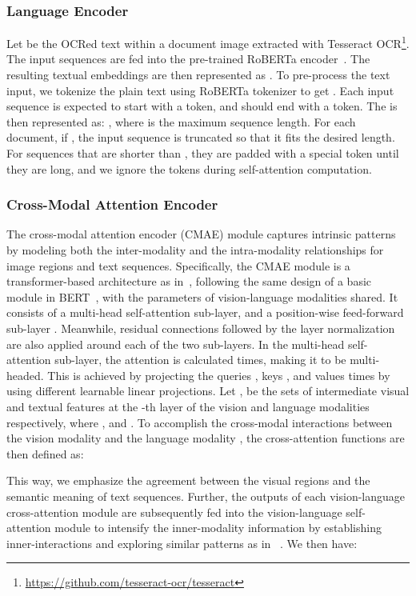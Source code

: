 \documentclass[preprint,review,12pt]{elsarticle}
\begin{document}
\subsubsection{Language Encoder}
Let  be the OCRed text within a document image extracted with Tesseract OCR\footnote{\url{https://github.com/tesseract-ocr/tesseract}}. The input sequences are fed into the pre-trained RoBERTa  encoder~\cite{liu2019roberta}. The resulting textual embeddings are then represented as . To pre-process the text input, we tokenize the plain text  using RoBERTa tokenizer to get . Each input sequence is expected to start with a  token, and should end with a  token. The  is then represented as: , where  is the maximum sequence length. For each document, if , the input sequence is truncated so that it fits the desired length. For sequences that are shorter than , they are padded with a special  token until they are  long, and we ignore the  tokens during self-attention computation.

\subsubsection{Cross-Modal Attention Encoder}
The cross-modal attention encoder (CMAE) module captures intrinsic patterns by modeling both the inter-modality and the intra-modality relationships for image regions and text sequences. Specifically, the CMAE module is a transformer-based architecture as in~\cite{vaswani2017attention}, following the same design of a basic module in BERT~\cite{devlin2018bert}, with the parameters of vision-language modalities shared. It consists of a multi-head self-attention sub-layer, and a position-wise feed-forward sub-layer . Meanwhile, residual connections followed by the layer normalization  are also applied around each of the two sub-layers. In the multi-head self-attention sub-layer, the attention is calculated  times, making it to be multi-headed. This is achieved by projecting the queries , keys , and values   times by using different learnable linear projections. Let ,  be the sets of intermediate visual and textual features at the -th layer of the vision and language modalities respectively, where , and . To accomplish the cross-modal interactions between the vision modality  and the language modality , the cross-attention functions are then defined as:

This way, we emphasize the agreement between the visual regions and the semantic meaning of text sequences. Further, the outputs of each vision-language cross-attention module are subsequently fed into the vision-language self-attention module to intensify the inner-modality information by establishing inner-interactions and exploring similar patterns as in ~\cite{li2021selfdoc}. We then have:
\end{document}
